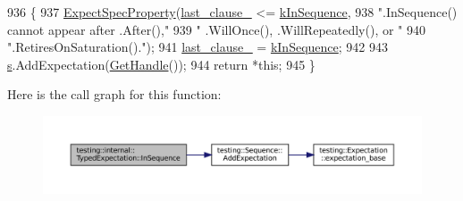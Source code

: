\begin{DoxyCode}
936                                                   \{
937     \hyperlink{classtesting_1_1internal_1_1ExpectationBase_a652adbe3fcca2950175e3859d59af268}{ExpectSpecProperty}(\hyperlink{classtesting_1_1internal_1_1ExpectationBase_a584f296e53b4cc002ddf5e65e44d72d9}{last\_clause\_} <= \hyperlink{classtesting_1_1internal_1_1ExpectationBase_a450f34b979ec5814c91d4eab6b78cfc2ac9e8abdc7de4697d2174c560e7a0a595}{kInSequence},
938                        \textcolor{stringliteral}{".InSequence() cannot appear after .After(),"}
939                        \textcolor{stringliteral}{" .WillOnce(), .WillRepeatedly(), or "}
940                        \textcolor{stringliteral}{".RetiresOnSaturation()."});
941     \hyperlink{classtesting_1_1internal_1_1ExpectationBase_a584f296e53b4cc002ddf5e65e44d72d9}{last\_clause\_} = \hyperlink{classtesting_1_1internal_1_1ExpectationBase_a450f34b979ec5814c91d4eab6b78cfc2ac9e8abdc7de4697d2174c560e7a0a595}{kInSequence};
942 
943     \hyperlink{namespaceservice__node__3_aa976421a49e0b54f23833423400849ae}{s}.AddExpectation(\hyperlink{classtesting_1_1internal_1_1TypedExpectation_adc2859080623243a3886a80ab62911da}{GetHandle}());
944     \textcolor{keywordflow}{return} *\textcolor{keyword}{this};
945   \}
\end{DoxyCode}
Here is the call graph for this function\+:
\nopagebreak
\begin{figure}[H]
\begin{center}
\leavevmode
\includegraphics[width=350pt]{classtesting_1_1internal_1_1TypedExpectation_ada9e9081a98435991310ac60483d1230_cgraph}
\end{center}
\end{figure}
\mbox{\label{classtesting_1_1internal_1_1TypedExpectation_ac0f45c73e3f816796f6c5dea2dc70131}} 
